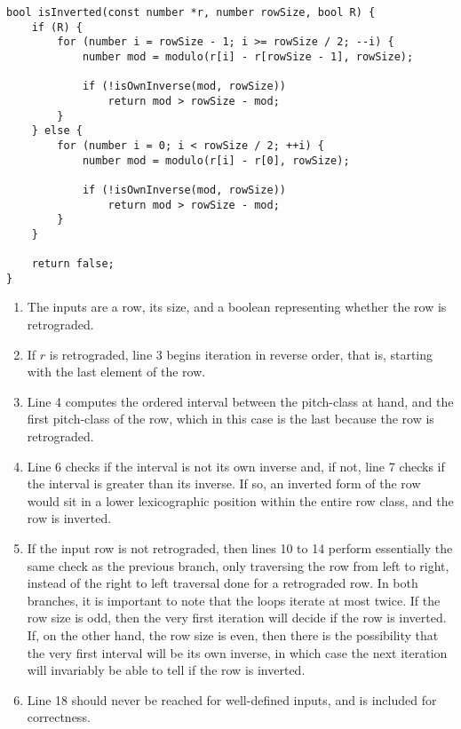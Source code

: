 \begin{lstlisting}[caption={Determining whether a representative of a row class is inverted.},label={isInverted}]
bool isInverted(const number *r, number rowSize, bool R) {
    if (R) {
        for (number i = rowSize - 1; i >= rowSize / 2; --i) {
            number mod = modulo(r[i] - r[rowSize - 1], rowSize);

            if (!isOwnInverse(mod, rowSize))
                return mod > rowSize - mod;
        }
    } else {
        for (number i = 0; i < rowSize / 2; ++i) {
            number mod = modulo(r[i] - r[0], rowSize);

            if (!isOwnInverse(mod, rowSize))
                return mod > rowSize - mod;
        }
    }

    return false;
}
\end{lstlisting}

\begin{enumerate}
\item The inputs are a row, its size, and a boolean representing whether the row is retrograded.
\addtocounter{enumi}{1}
\item If $r$ is retrograded, line 3 begins iteration in reverse order, that is, starting with the last element of the row.
\item Line 4 computes the ordered interval between the pitch-class at hand, and the first pitch-class of the row, which in this case is the last because the row is retrograded.
\addtocounter{enumi}{1}
\item Line 6 checks if the interval is not its own inverse and, if not, line 7 checks if the interval is greater than its inverse. If so, an inverted form of the row would sit in a lower lexicographic position within the entire row class, and the row is inverted.
\addtocounter{enumi}{3}
\item If the input row is not retrograded, then lines 10 to 14 perform essentially the same check as the previous branch, only traversing the row from left to right, instead of the right to left traversal done for a retrograded row. In both branches, it is important to note that the loops iterate at most twice. If the row size is odd, then the very first iteration will decide if the row is inverted. If, on the other hand, the row size is even, then there is the possibility that the very first interval will be its own inverse, in which case the next iteration will invariably be able to tell if the row is inverted.
\addtocounter{enumi}{7}
\item Line 18 should never be reached for well-defined inputs, and is included for correctness.
\end{enumerate}

